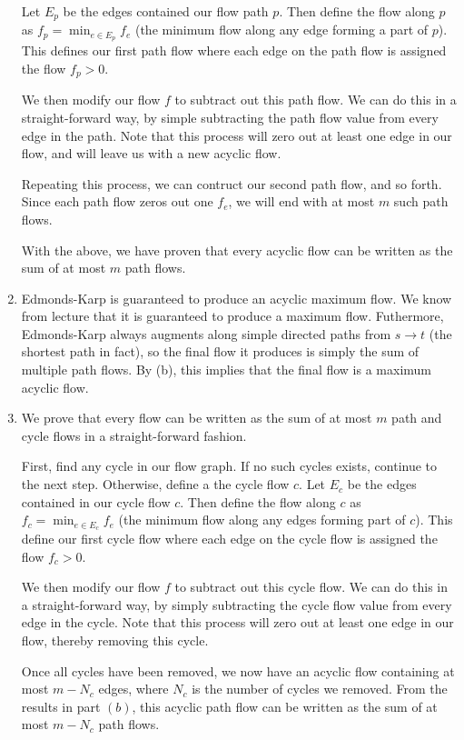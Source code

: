 \documentclass[12pt]{exam}
\begin{document}
\begin{questions}
\begin{solution}
\begin{enumerate}[label=(\alph*)]
      Let $E_p$ be the edges contained our flow path $p$. Then define the flow along $p$ as $f_p = \min_{e \in E_p} f_e$ (the minimum flow along any edge forming a part of $p$). This defines our first path flow where each edge on the path flow is assigned the flow $f_p > 0$.

      We then modify our flow $f$ to subtract out this path flow. We can do this in a straight-forward way, by simple subtracting the path flow value from every edge in the path. Note that this process will zero out at least one edge in our flow, and will leave us with a new acyclic flow.

      Repeating this process, we can contruct our second path flow, and so forth. Since each path flow zeros out one $f_e$, we will end with at most $m$ such path flows.

      With the above, we have proven that every acyclic flow can be written as the sum of at most $m$ path flows.

    \item
      Edmonds-Karp is guaranteed to produce an acyclic maximum flow. We know from lecture that it is guaranteed to produce a maximum flow. Futhermore, Edmonds-Karp always augments along simple directed paths from $s \to t$ (the shortest path in fact), so the final flow it produces is simply the sum of multiple path flows. By (b), this implies that the final flow is a maximum acyclic flow.
    \item 
      We prove that every flow can be written as the sum of at most $m$ path and cycle flows in a straight-forward fashion.

      First, find any cycle in our flow graph. If no such cycles exists, continue to the next step. Otherwise, define a the cycle flow $c$. Let $E_c$ be the edges contained in our cycle flow $c$. Then define the flow along $c$ as $f_c = \min_{e \in E_c} f_e$ (the minimum flow along any edges forming part of $c$). This define our first cycle flow where each edge on the cycle flow is assigned the flow $f_c > 0$.

      We then modify our flow $f$ to subtract out this cycle flow. We can do this in a straight-forward way, by simply subtracting the cycle flow value from every edge in the cycle. Note that this process will zero out at least one edge in our flow, thereby removing this cycle.

      Once all cycles have been removed, we now have an acyclic flow containing at most $m - N_c$ edges, where $N_c$ is the number of cycles we removed. From the results in part $(b)$, this acyclic path flow can be written as the sum of at most $m - N_c$ path flows.


\end{enumerate}
\end{solution}
\end{questions}
\end{document}
